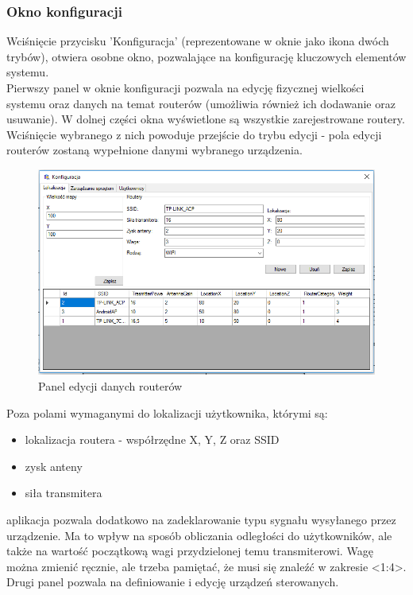 \subsubsection{Okno konfiguracji}
Wciśnięcie przycisku 'Konfiguracja' (reprezentowane w oknie jako ikona dwóch trybów), otwiera osobne okno, pozwalające na konfigurację kluczowych elementów systemu.\\
Pierwszy panel w oknie konfiguracji pozwala na edycję fizycznej wielkości systemu oraz danych na temat routerów (umożliwia również ich dodawanie oraz usuwanie).
W dolnej części okna wyświetlone są wszystkie zarejestrowane routery. Wciśnięcie wybranego z nich powoduje przejście do trybu edycji - pola edycji routerów zostaną wypełnione danymi wybranego urządzenia.
\begin{figure}[H]			
	\centering
	\caption{Panel edycji danych routerów}
	\includegraphics[width=1.0\textwidth]{panel_konf_router}
\end{figure}
Poza polami wymaganymi do lokalizacji użytkownika, którymi są:
\begin{itemize}
	\item lokalizacja routera - współrzędne X, Y, Z oraz SSID
	\item zysk anteny
	\item siła transmitera
\end{itemize}
aplikacja pozwala dodatkowo na zadeklarowanie typu sygnału wysyłanego przez urządzenie. Ma to wpływ na sposób obliczania odległości do użytkowników, ale także na wartość początkową wagi przydzielonej temu transmiterowi. Wagę można zmienić ręcznie, ale trzeba pamiętać, że musi się znaleźć w zakresie <1:4>.\\
Drugi panel pozwala na definiowanie i edycję urządzeń sterowanych.
